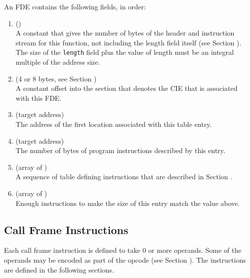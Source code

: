 An FDE contains the following fields, in order:
\begin{enumerate}[1. ]
\item \HFNlength{} ()  \\
A constant that gives the number of bytes of the header and
instruction stream for this function, not including the length
field itself 
(see Section ). 
The size of the \texttt{length} field
plus the value of length must be an integral multiple of the
address size.

\item \HFNCIEpointer{} (4 or 8 bytes, see Section ) \\
A constant 
offset into the \dotdebugframe{}
section that denotes
the CIE that is associated with this FDE.

\item  \HFNinitiallocation{} (target address) 
\db
\\
The address of the first location associated with this table
entry.
\db 

\item  \HFNaddressrange{} (target address) \\
The number 
of bytes of program instructions described by this entry.

\item \HFNinstructions{} (array of \HFTubyte) \\
A sequence of table defining instructions that are described 
in Section .

\item \HFNpadding{} (array of \HFTubyte) \\
Enough \DWCFAnop{} instructions 
to make the size of this entry match the \HFNlength{} value above.
\end{enumerate}

\subsection{Call Frame Instructions}
\label{chap:callframeinstructions}
Each call frame instruction is defined to take 0 or more
operands. Some of the operands may be encoded as part of the
opcode (see Section ). 
The instructions are defined in
the following sections.

